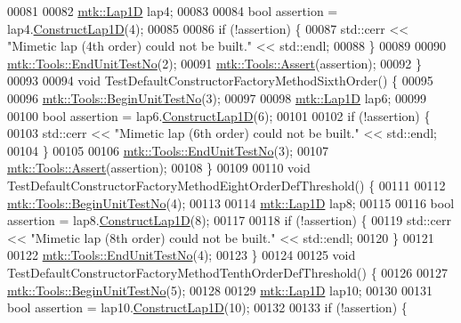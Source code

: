 \begin{DoxyCode}
00081 
00082   \hyperlink{classmtk_1_1Lap1D}{mtk::Lap1D} lap4;
00083 
00084   \textcolor{keywordtype}{bool} assertion = lap4.\hyperlink{classmtk_1_1Lap1D_a685dcba88c08cf5b7b6c2aa4669a472c}{ConstructLap1D}(4);
00085 
00086   \textcolor{keywordflow}{if} (!assertion) \{
00087     std::cerr << \textcolor{stringliteral}{"Mimetic lap (4th order) could not be built."} << std::endl;
00088   \}
00089 
00090   \hyperlink{classmtk_1_1Tools_aba67d9dc35c9c1c49430fcc9ea035e03}{mtk::Tools::EndUnitTestNo}(2);
00091   \hyperlink{classmtk_1_1Tools_ac6804df469c94ab6a796fb64f1e44a89}{mtk::Tools::Assert}(assertion);
00092 \}
00093 
00094 \textcolor{keywordtype}{void} TestDefaultConstructorFactoryMethodSixthOrder() \{
00095 
00096   \hyperlink{classmtk_1_1Tools_afc29ecaf337a13ed2e817d3890a5a441}{mtk::Tools::BeginUnitTestNo}(3);
00097 
00098   \hyperlink{classmtk_1_1Lap1D}{mtk::Lap1D} lap6;
00099 
00100   \textcolor{keywordtype}{bool} assertion = lap6.\hyperlink{classmtk_1_1Lap1D_a685dcba88c08cf5b7b6c2aa4669a472c}{ConstructLap1D}(6);
00101 
00102   \textcolor{keywordflow}{if} (!assertion) \{
00103     std::cerr << \textcolor{stringliteral}{"Mimetic lap (6th order) could not be built."} << std::endl;
00104   \}
00105 
00106   \hyperlink{classmtk_1_1Tools_aba67d9dc35c9c1c49430fcc9ea035e03}{mtk::Tools::EndUnitTestNo}(3);
00107   \hyperlink{classmtk_1_1Tools_ac6804df469c94ab6a796fb64f1e44a89}{mtk::Tools::Assert}(assertion);
00108 \}
00109 
00110 \textcolor{keywordtype}{void} TestDefaultConstructorFactoryMethodEightOrderDefThreshold() \{
00111 
00112   \hyperlink{classmtk_1_1Tools_afc29ecaf337a13ed2e817d3890a5a441}{mtk::Tools::BeginUnitTestNo}(4);
00113 
00114   \hyperlink{classmtk_1_1Lap1D}{mtk::Lap1D} lap8;
00115 
00116   \textcolor{keywordtype}{bool} assertion = lap8.\hyperlink{classmtk_1_1Lap1D_a685dcba88c08cf5b7b6c2aa4669a472c}{ConstructLap1D}(8);
00117 
00118   \textcolor{keywordflow}{if} (!assertion) \{
00119     std::cerr << \textcolor{stringliteral}{"Mimetic lap (8th order) could not be built."} << std::endl;
00120   \}
00121 
00122   \hyperlink{classmtk_1_1Tools_aba67d9dc35c9c1c49430fcc9ea035e03}{mtk::Tools::EndUnitTestNo}(4);
00123 \}
00124 
00125 \textcolor{keywordtype}{void} TestDefaultConstructorFactoryMethodTenthOrderDefThreshold() \{
00126 
00127   \hyperlink{classmtk_1_1Tools_afc29ecaf337a13ed2e817d3890a5a441}{mtk::Tools::BeginUnitTestNo}(5);
00128 
00129   \hyperlink{classmtk_1_1Lap1D}{mtk::Lap1D} lap10;
00130 
00131   \textcolor{keywordtype}{bool} assertion = lap10.\hyperlink{classmtk_1_1Lap1D_a685dcba88c08cf5b7b6c2aa4669a472c}{ConstructLap1D}(10);
00132 
00133   \textcolor{keywordflow}{if} (!assertion) \{

\end{DoxyCode}
